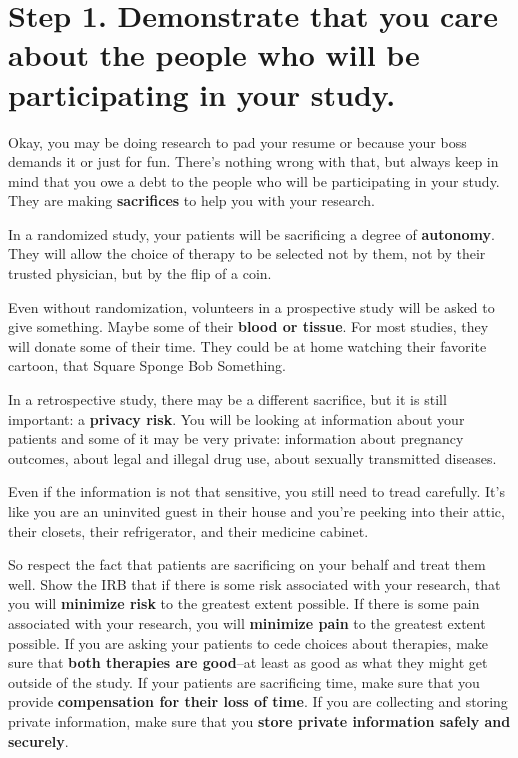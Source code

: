 \documentclass[
  letterpaper,
  DIV=11,
  numbers=noendperiod]{scrreprt}
\begin{document}
\section{Step 1. Demonstrate that you care about the people who will be
participating in your
study.}\label{step-1.-demonstrate-that-you-care-about-the-people-who-will-be-participating-in-your-study.}

Okay, you may be doing research to pad your resume or because your boss
demands it or just for fun. There's nothing wrong with that, but always
keep in mind that you owe a debt to the people who will be participating
in your study. They are making \textbf{sacrifices} to help you with your
research.

In a randomized study, your patients will be sacrificing a degree of
\textbf{autonomy}. They will allow the choice of therapy to be selected
not by them, not by their trusted physician, but by the flip of a coin.

Even without randomization, volunteers in a prospective study will be
asked to give something. Maybe some of their \textbf{blood or tissue}.
For most studies, they will donate some of their time. They could be at
home watching their favorite cartoon, that Square Sponge Bob Something.

In a retrospective study, there may be a different sacrifice, but it is
still important: a \textbf{privacy risk}. You will be looking at
information about your patients and some of it may be very private:
information about pregnancy outcomes, about legal and illegal drug use,
about sexually transmitted diseases.

Even if the information is not that sensitive, you still need to tread
carefully. It's like you are an uninvited guest in their house and
you're peeking into their attic, their closets, their refrigerator, and
their medicine cabinet.

So respect the fact that patients are sacrificing on your behalf and
treat them well. Show the IRB that if there is some risk associated with
your research, that you will \textbf{minimize risk} to the greatest
extent possible. If there is some pain associated with your research,
you will \textbf{minimize pain} to the greatest extent possible. If you
are asking your patients to cede choices about therapies, make sure that
\textbf{both therapies are good}--at least as good as what they might
get outside of the study. If your patients are sacrificing time, make
sure that you provide \textbf{compensation for their loss of time}. If
you are collecting and storing private information, make sure that you
\textbf{store private information safely and securely}.
\end{document}
